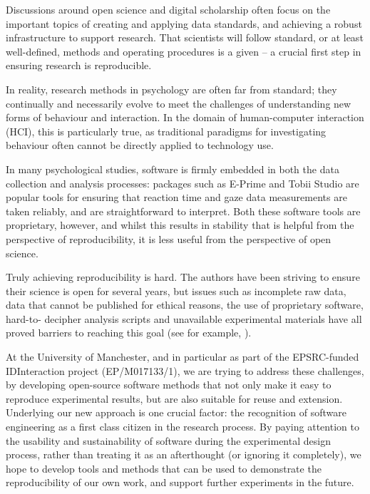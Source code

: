 \documentclass[a4paper,USenglish]{dagrep}
\begin{document}
{}
\license
{}
Discussions around open science and digital scholarship often focus on the 
important topics of creating and applying data standards, and achieving a robust  
infrastructure to support research. That scientists will follow standard, or at 
least well-defined, methods and operating procedures is a given – a crucial first 
step in ensuring research is reproducible.

In reality, research methods in psychology are often far from standard; they 
continually and necessarily evolve to meet the challenges of understanding 
new forms of behaviour and interaction. In the domain of human-computer 
interaction (HCI), this is particularly true, as traditional paradigms for
investigating behaviour often cannot be directly applied to technology use.

In many psychological studies, software is firmly embedded in both the data 
collection and analysis processes: packages such as E-Prime and Tobii Studio are
popular tools for ensuring that reaction time and gaze data measurements are
taken reliably, and are straightforward to interpret. Both these software tools
are proprietary, however, and whilst this results in stability that is helpful from
the perspective of reproducibility, it is less useful from the perspective of open
science.

Truly achieving reproducibility is hard. The authors have been striving to ensure 
their science is open for several years, but issues such as incomplete raw data, data 
that cannot be published for ethical reasons, the use of proprietary software, hard-to-
decipher analysis scripts and unavailable experimental materials have all proved 
barriers to reaching this goal (see for example, \cite{Jay2013TR}).

At the University of Manchester, and in particular as part of the EPSRC-funded 
IDInteraction project (EP/M017133/1), we are trying to address these challenges, by 
developing open-source software methods that not only make it easy to 
reproduce experimental results, but are also suitable for reuse and extension. 
Underlying our new approach is one crucial factor: the recognition of software 
engineering as a first class citizen in the research process. By paying attention to the 
usability and sustainability of software during the 
experimental design process, rather than treating it as an afterthought (or ignoring 
it completely), we hope to develop tools and methods that can be used to demonstrate 
the reproducibility of our own work, and support further experiments in the future.
\end{document}
